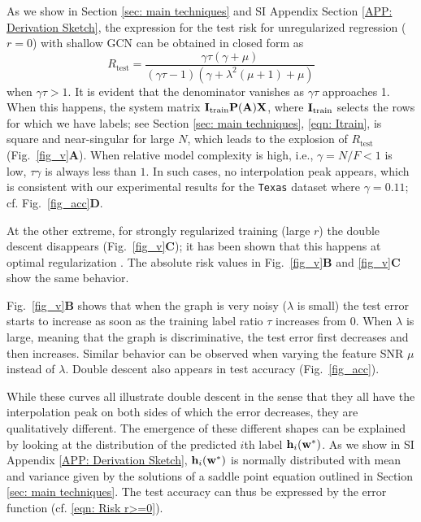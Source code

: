 \documentclass[9pt,twocolumn]{pnas-new}
\begin{document}
As we show in Section \ref{sec: main techniques} and SI Appendix Section \ref{APP: Derivation Sketch}, the expression for the test risk for unregularized regression ($r = 0$) with shallow GCN can be obtained in closed form as
$$
    R_{\mathrm{test}} = \frac{\gamma\tau(\gamma+\mu)}{(\gamma\tau-1)\left(\gamma+\lambda^{2}(\mu+1)+\mu\right)}
$$
when $\gamma\tau>1$. It is evident that the denominator vanishes as $\gamma \tau$ approaches 1. When this happens, the system matrix $\mathbf{I}_{\mathrm{train}}\mathbf{P}(\mathbf{A})\mathbf{X}$, where $\mathbf{I}_{\mathrm{train}}$ selects the rows for which we have labels; see Section \ref{sec: main techniques}, \eqref{eqn: Itrain}, is square and near-singular for large $N$, which leads to the explosion of $R_{\mathrm{test}}$ (Fig.~\ref{fig_v}\textbf{\textsf{A}}).  When relative model complexity is high, i.e., $\gamma=N/F < 1$ is low, $\tau\gamma $ is always less than $1$. In such cases, no interpolation peak appears, which is consistent with our experimental results for the \texttt{Texas} dataset where $\gamma = 0.11$; cf. Fig.~\ref{fig_acc}\textbf{\textsf{D}}.

At the other extreme, for strongly regularized training (large $r$) the double descent disappears (Fig.~\ref{fig_v}\textbf{\textsf{C}}); it has been shown that this happens at optimal regularization \cite{mei2022generalization,canatar2021spectral}. The absolute risk values in Fig.~\ref{fig_v}\textbf{\textsf{B}} and \ref{fig_v}\textbf{\textsf{C}} show the same behavior. 

Fig.~\ref{fig_v}\textbf{\textsf{B}} shows that when the graph is very noisy ($\lambda$ is small)  the test error starts to increase as soon as the training label ratio $\tau$ increases from $0$. When $\lambda$ is large, meaning that the graph is discriminative, the test error first decreases and then increases. Similar behavior can be observed when varying the feature SNR $\mu$ instead of $\lambda$. Double descent also appears in test accuracy (Fig.~\ref{fig_acc}).

While these curves all illustrate double descent in the sense that they all have the interpolation peak on both sides of which the error decreases, they are qualitatively different. The emergence of these different shapes can be explained by looking at the distribution of the predicted $i$th label $\mathbf{h}_i(\mathbf{w}^*)$. As we show in SI Appendix \ref{APP: Derivation Sketch}, $\mathbf{h}_i(\mathbf{w}^*)$ is normally distributed with mean and variance given by the solutions of a saddle point equation outlined in Section \ref{sec: main techniques}. The test accuracy can thus be expressed by the error function (cf. \eqref{eqn: Risk r>=0}).
\end{document}
